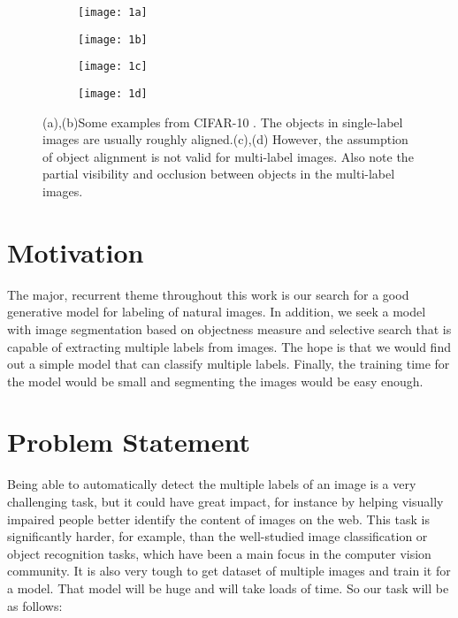 \begin{figure}[ht] 
  \begin{subfigure}[b]{0.25\linewidth}
    \centering
    \texttt{[image: 1a]}
    \caption{} 
    \label{1a} 
    \vspace{4ex}
  \end{subfigure}%
  \begin{subfigure}[b]{0.25\linewidth}
    \centering
    \texttt{[image: 1b]}
    \caption{} 
    \label{1b} 
    \vspace{4ex}
  \end{subfigure}%
  \begin{subfigure}[b]{0.25\linewidth}
    \centering
    \texttt{[image: 1c]} 
    \caption{} 
    \label{1c} 
    \vspace{4ex}
  \end{subfigure}%
  \begin{subfigure}[b]{0.25\linewidth}
    \centering
    \texttt{[image: 1d]} 
    \caption{} 
    \label{1d}
    \vspace{4ex} 
    \end{subfigure}
  \caption{(a),(b)Some examples from CIFAR-10 \cite{17}. The objects in single-label
images are usually roughly aligned.(c),(d) However, the assumption of object alignment is not valid for multi-label
images. Also note the partial visibility and occlusion
between objects in the multi-label images.}
  \label{fig1} 
\end{figure}

\section{Motivation}
The major, recurrent theme throughout this work is our search for a good generative model for labeling of natural
images. In addition, we seek a model with image segmentation based on objectness measure and selective search that is capable of extracting multiple labels from images. The hope is that we would find out a simple model that can classify multiple labels. Finally, the training time for the model would be small and segmenting the images would be easy enough.

\section{Problem Statement}\label{sec:ProbStatement}
Being able to automatically detect the multiple labels of an
image is a very
challenging task, but it could have great impact, for instance
by helping visually impaired people better identify the
content of images on the web. This task is significantly
harder, for example, than the well-studied image classification or object recognition tasks, which have been a main
focus in the computer vision community. It is also very tough to get dataset of multiple images and train it for a model. That model will be huge and will take loads of time. So our task will be as follows:

